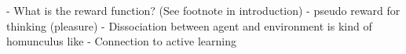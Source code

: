 \label{conclusion}


- What is the reward function? (See footnote in introduction)
- pseudo reward for thinking (pleasure)
- Dissociation between agent and environment is kind of homunculus like
- Connection to active learning
